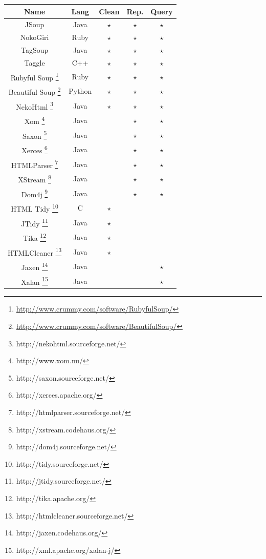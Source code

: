 \documentclass[12pt,letterpaper]{article}
\begin{document}
\begin{center}
\begin{tabular}{c|c|c|c|c}
Name & Lang & Clean & Rep. & Query\\
\hline
JSoup & Java & $\star$ & $\star$ & $\star$\\
\hline
NokoGiri & Ruby & $\star$ & $\star$ & $\star$\\
\hline
TagSoup & Java & $\star$ & $\star$ & $\star$\\
\hline
Taggle & C++ & $\star$ & $\star$ & $\star$\\
\hline
Rubyful Soup
\footnote{\url{http://www.crummy.com/software/RubyfulSoup/}} & Ruby
&$\star$ & $\star$ & $\star$\\
\hline
Beautiful Soup \footnote{\url{http://www.crummy.com/software/BeautifulSoup/}}
&Python&$\star$ & $\star$ & $\star$\\
\hline
NekoHtml \footnote{http://nekohtml.sourceforge.net/}  & Java & $\star$ & $\star$&$\star$\\
\hline
Xom  \footnote{http://www.xom.nu/} & Java & & $\star$ & $\star$\\
\hline
Saxon \footnote{http://saxon.sourceforge.net/} & Java & & $\star$ &$\star$\\
\hline
Xerces \footnote{http://xerces.apache.org/}& Java & & $\star$ &$\star$\\
\hline
HTMLParser \footnote{http://htmlparser.sourceforge.net/} & Java & & $\star$&$\star$\\
\hline
XStream \footnote{http://xstream.codehaus.org/} & Java & & $\star$&$\star$\\
\hline
Dom4j \footnote{http://dom4j.sourceforge.net/} & Java & & $\star$ & $\star$\\
\hline
HTML Tidy \footnote{http://tidy.sourceforge.net/} & C & $\star$ & &\\
\hline
JTidy \footnote{http://jtidy.sourceforge.net/} & Java & $\star$ & &\\
\hline
Tika \footnote{http://tika.apache.org/} & Java & $\star$ & &\\
\hline
HTMLCleaner \footnote{http://htmlcleaner.sourceforge.net/} & Java & $\star$ & &\\
\hline
Jaxen \footnote{http://jaxen.codehaus.org/} & Java & & &$\star$\\
\hline
Xalan \footnote{http://xml.apache.org/xalan-j/} & Java & & &$\star$\\
\hline

\end{tabular}
\end{center}
\end{document}
